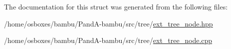 The documentation for this struct was generated from the following files\+:\begin{DoxyCompactItemize}
\item 
/home/osboxes/bambu/\+Pand\+A-\/bambu/src/tree/\hyperlink{ext__tree__node_8hpp}{ext\+\_\+tree\+\_\+node.\+hpp}\item 
/home/osboxes/bambu/\+Pand\+A-\/bambu/src/tree/\hyperlink{ext__tree__node_8cpp}{ext\+\_\+tree\+\_\+node.\+cpp}\end{DoxyCompactItemize}
